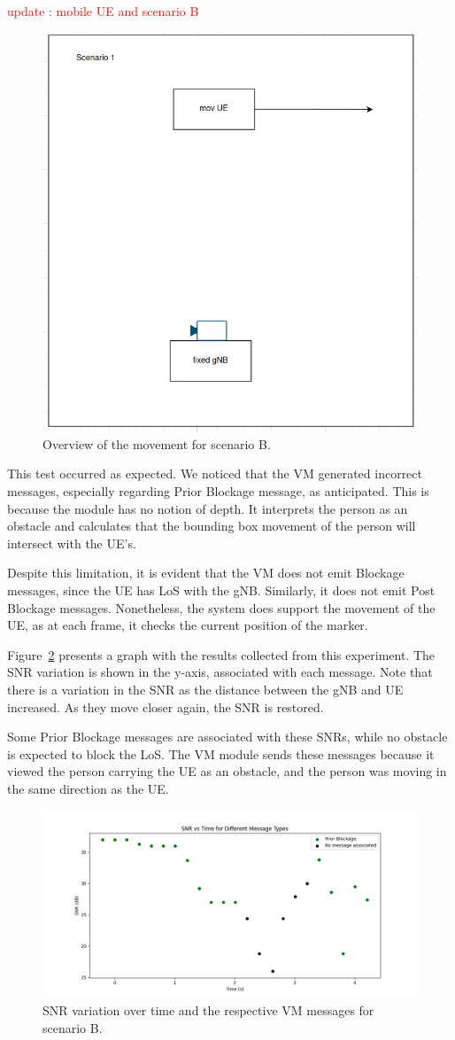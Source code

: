 \textcolor{red}{update : mobile UE and scenario B}
\begin{figure}[H]
    \centering
    \includegraphics[width=0.5\linewidth]{figures/scenario1}
    \caption{Overview of the movement for scenario B.}
    \label{fig:test_movUE}
\end{figure}

This test occurred as expected.
We noticed that the VM generated incorrect messages, especially regarding Prior Blockage message, as anticipated.
This is because the module has no notion of depth.
It interprets the person as an obstacle and calculates that the bounding box movement of the person will intersect with the UE's.

Despite this limitation, it is evident that the VM does not emit Blockage messages, since the UE has LoS with the gNB\@.
Similarly, it does not emit Post Blockage messages.
Nonetheless, the system does support the movement of the UE, as at each frame, it checks the current position of the marker.

Figure~\ref{fig:results_1} presents a graph with the results collected from this experiment.
The SNR variation is shown in the y-axis, associated with each message.
Note that there is a variation in the SNR as the distance between the gNB and UE increased.
As they move closer again, the SNR is restored.

Some Prior Blockage messages are associated with these SNRs, while no obstacle is expected to block the LoS\@.
The VM module sends these messages because it viewed the person carrying the UE as an obstacle, and the person was moving in the same direction as the UE\@.

\begin{figure}[H]
    \centering
    \includegraphics[width=\linewidth]{figures/results_1}
    \caption{SNR variation over time and the respective VM messages for scenario B.}
    \label{fig:results_1}
\end{figure}

